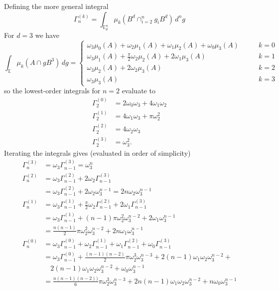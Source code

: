 \documentclass[12pt]{report}
\begin{document}
Defining the more general integral
\begin{equation}
  \Gamma_n^{(k)} = \int_{\mathbb{E}_d^n} \mu_k (B^d \cap_{i=2}^n g_i B^d) \, d^n g
\end{equation}
For $d=3$ we have
\begin{equation}
  \int_{\mathbb{E}} \mu_k (A \cap g B^3) \, dg =
  \begin{cases}
    \omega_3 \mu_0(A) + \omega_2 \mu_1(A) +
    \omega_1 \mu_2(A) + \omega_0 \mu_3(A)
    & \qquad k=0 \\
    \omega_3 \mu_1(A) + \frac{\pi}{2} \omega_2 \mu_2(A)
    + 2 \omega_1 \mu_3(A)
    & \qquad k=1 \\
    \omega_3 \mu_2(A) + 2 \omega_2 \mu_3(A) & \qquad k=2 \\
    \omega_3 \mu_3(A) & \qquad k=3
  \end{cases}
\end{equation}
so the lowest-order integrals for $n=2$ evaluate to
\begin{align}
  \Gamma_2^{(0)} &= 2 \omega_0 \omega_3 + 4 \omega_1 \omega_2 \\
  \Gamma_2^{(1)} &= 4 \omega_1 \omega_3 + \pi \omega_2^2 \\
  \Gamma_2^{(2)} &= 4 \omega_2 \omega_3 \\
  \Gamma_2^{(3)} &= \omega_3^2.
\end{align}
Iterating the integrals gives (evaluated in order of simplicity)
\begin{align}
  \Gamma_n^{(3)} &=
  \omega_3 \Gamma_{n-1}^{(3)}
  = \omega_3^n \\
  \Gamma_n^{(2)} &=
  \omega_3 \Gamma_{n-1}^{(2)} + 2 \omega_2 \Gamma_{n-1}^{(3)}
  \nonumber \\ &=
  \omega_3 \Gamma_{n-1}^{(2)} + 2 \omega_2 \omega_3^{n-1}
  = 2 n \omega_2 \omega_3^{n-1} \\
  \Gamma_n^{(1)} &=
  \omega_3 \Gamma_{n-1}^{(1)} +
  \frac{\pi}{2} \omega_2 \Gamma_{n-1}^{(2)} +
  2 \omega_1 \Gamma_{n-1}^{(3)}
  \nonumber \\ &=
  \omega_3 \Gamma_{n-1}^{(1)} +
  (n-1) \pi \omega_2^2 \omega_3^{n-2} +
  2 \omega_1 \omega_3^{n-1}
  \nonumber \\ &=
  \frac{n(n-1)}{2} \pi \omega_2^2 \omega_3^{n-2} +
  2n \omega_1 \omega_3^{n-1}
  \\
  \Gamma_n^{(0)} &=
  \omega_3 \Gamma_{n-1}^{(0)} +
  \omega_2 \Gamma_{n-1}^{(1)} +
  \omega_1 \Gamma_{n-1}^{(2)} +
  \omega_0 \Gamma_{n-1}^{(3)}
  \nonumber \\ &=
  \omega_3 \Gamma_{n-1}^{(0)} +
  \frac{(n-1)(n-2)}{2} \pi \omega_2^3 \omega_3^{n-3} +
  2(n-1) \omega_1 \omega_2 \omega_3^{n-2} +
  \nonumber \\ & \quad
  2(n-1) \omega_1 \omega_2 \omega_3^{n-2} +
  \omega_0 \omega_3^{n-1}
  \nonumber \\ &=
  \frac{n(n-1)(n-2))}{6} \pi \omega_2^3 \omega_3^{n-3} +
  2 n(n-1) \omega_1 \omega_2 \omega_3^{n-2} +
  n \omega_0 \omega_3^{n-1}
\end{align}
\end{document}
